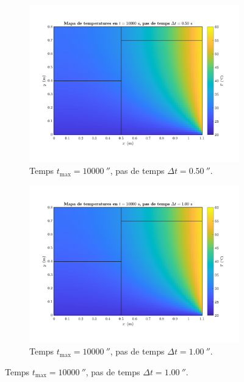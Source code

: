 \begin{figure}[ht]
	\centering
	\begin{subfigure}{.5\textwidth}
		\centering
		\includegraphics[width=.95\linewidth]{imagenes/04_analisi_influencia_dades_numeriques/pas_temps/pas_temps_13.pdf}
		\vspace{-15pt}
		\caption{Temps $t_\text{max} = 10000 \ \second$, pas de temps $\Delta t = 0.50 \ \second$.}
		\label{fig:pas_temps_13}
	\end{subfigure}%
	\begin{subfigure}{.5\textwidth}
		\centering
		\includegraphics[width=.95\linewidth]{imagenes/04_analisi_influencia_dades_numeriques/pas_temps/pas_temps_14.pdf}
		\vspace{-15pt}
		\caption{Temps $t_\text{max} = 10000 \ \second$, pas de temps $\Delta t = 1.00 \ \second$.}

\end{subfigure}
\end{figure}

